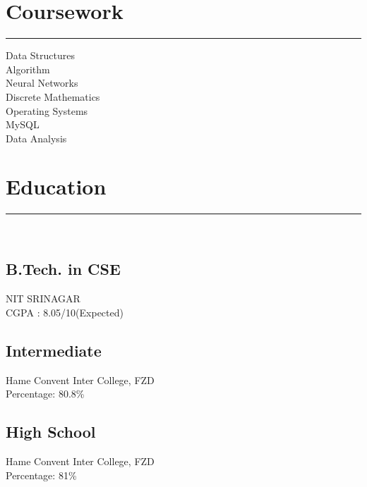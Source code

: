 \documentclass[]{rahulworld-resume}
\begin{document}
\begin{minipage}[t]{0.33\textwidth}
\section{Coursework}
\noindent\rule{5cm}{0.4pt}

Data Structures\\
Algorithm\\
Neural Networks\\
Discrete Mathematics\\
Operating Systems\\
MySQL\\
Data Analysis
\sectionsep
\section{Education} 
\noindent\rule{5cm}{0.4pt}\\
\subsection{B.Tech. in CSE}
NIT SRINAGAR \\
CGPA : 8.05/10(Expected)\\
\vspace{8pt}
\subsection{Intermediate}
Hame Convent Inter College, FZD\\
Percentage: 80.8\%\\
\vspace{8pt}
\subsection{High School}
Hame Convent Inter College, FZD\\
Percentage: 81\%
\sectionsep
%
%

\end{minipage} 
\hfill
\end{document}

